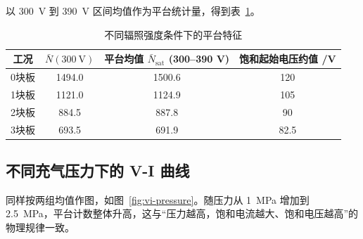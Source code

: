 \documentclass[12pt,a4paper]{article}
\begin{document}
以 \SI{300}{\volt} 到 \SI{390}{\volt} 区间均值作为平台统计量，得到表~\ref{tab:intensity-summary}。

\begin{table}[htbp]
\centering
\caption{不同辐照强度条件下的平台特征\label{tab:intensity-summary}}
\begin{tabular}{cccc}
\toprule
工况 & $\bar{N}(\SI{300}{\volt})$ & 平台均值 $\bar{N}_{\mathrm{sat}}$ (300--390 V) & 饱和起始电压约值 /V \\
\midrule
0块板 & 1494.0 & 1500.6 & 120 \\
1块板 & 1121.0 & 1124.9 & 105 \\
2块板 & 884.5  & 887.8  & 90 \\
3块板 & 693.5  & 691.9  & 82.5 \\
\bottomrule
\end{tabular}
\end{table}

\subsection{不同充气压力下的 V-I 曲线}
同样按两组均值作图，如图~\ref{fig:vi-pressure}。随压力从 \SI{1}{MPa} 增加到 \SI{2.5}{MPa}，平台计数整体升高，这与“压力越高，饱和电流越大、饱和电压越高”的物理规律一致。
\end{document}
